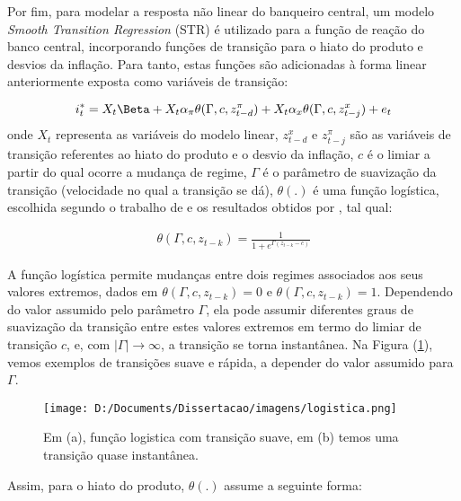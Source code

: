 \documentclass[
	article,			%
	11pt,				%
	oneside,			%
	a4paper,			%
	english,			%
	brazil,				%
	]{abntex2}
\begin{document}
	Por fim, para modelar a resposta não linear do banqueiro central, um modelo \textit{Smooth Transition Regression} (STR) é utilizado para a função de reação do banco central, incorporando funções de transição para o hiato do produto e desvios da inflação. Para tanto, estas funções são adicionadas à forma linear anteriormente exposta como variáveis de transição:
	
	\begin{equation}
		i_t^* = X_t \Beta + X_t \alpha_\pi \theta(\Gamma,c,z_{t-d}^\pi) + X_t \alpha_x \theta (\Gamma,c,z_{t-j}^x) + e_t
	\end{equation}
	onde $X_t$ representa as variáveis do modelo linear, $z_{t-d}^x$ e $z_{t-j}^\pi$ são as variáveis de transição referentes ao hiato do produto e o desvio da inflação, $c$ é o limiar a partir do qual ocorre a mudança de regime, $\Gamma$ é o parâmetro de suavização da transição (velocidade no qual a transição se dá), $\theta(.)$ é uma função logística, escolhida segundo o trabalho de  e os resultados obtidos por , tal qual:
	
	\begin{eqnarray}  \label{func_log}
		\theta (\Gamma,c,z_{t-k}) = \frac{1}{1+e^{\Gamma (z_{t-k} - c)}} 
	\end{eqnarray}
	
	A função logística permite mudanças entre dois regimes associados aos seus valores extremos, dados em $\theta (\Gamma,c,z_{t-k}) = 0$ e $\theta (\Gamma,c,z_{t-k}) = 1$. Dependendo do valor assumido pelo parâmetro $\Gamma$, ela pode assumir diferentes graus de suavização da transição entre estes valores extremos em termo do limiar de transição $c$, e, com $| \Gamma | \rightarrow \infty$, a transição se torna instantânea. Na Figura (\ref{fig:logistica}), vemos exemplos de transições suave e rápida, a depender do valor assumido para $\Gamma$. 
	
	
	\hfill \break
	\hfill \break
	\hfill \break
	\hfill \break
	\hfill \break
	\hfill \break
	\hfill \break
	
	\begin{figure}[!h]
	\texttt{[image: D:/Documents/Dissertacao/imagens/logistica.png]}
	\caption{Em (a), função logistica com transição suave, em (b) temos uma transição quase instantânea. }
	\label{fig:logistica}
	\end{figure}
	
	Assim, para o hiato do produto, $\theta(.)$ assume a seguinte forma:
	
\end{document}
